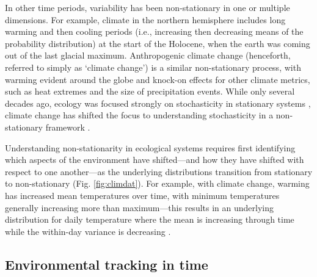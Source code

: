 \documentclass[11pt,letterpaper]{article}
\begin{document}
In other time periods, variability has been non-stationary in one or multiple dimensions. For example, climate in the northern hemisphere includes long warming and then cooling periods (i.e., increasing then decreasing means of the probability distribution) at the start of the Holocene, when the earth was coming out of the last glacial maximum. Anthropogenic climate change (henceforth, referred to simply as `climate change') is a similar non-stationary process, with warming evident around the globe and knock-on effects for other climate metrics, such as heat extremes and the size of precipitation events. While only several decades ago, ecology was focused strongly on stochasticity in stationary systems \citep[e.g.,][]{Ripa1996,Kaitala1997}, climate change has shifted the focus to understanding stochasticity in a non-stationary framework \citep[e.g.,][]{cazwavelets,ehrlen2016,legault2019}.

Understanding non-stationarity in ecological systems requires first identifying which aspects of the environment have shifted---and how they have shifted with respect to one another---as the underlying distributions transition from stationary to non-stationary (Fig. \ref{fig:climdat}). For example, with climate change, warming has increased mean temperatures over time, with minimum temperatures generally increasing more than maximum---this results in an underlying distribution for daily temperature where the mean is increasing through time while the within-day variance is decreasing \citep{ipcc2013,screen2014}. 

\subsection{Environmental tracking in time}
\end{document}

